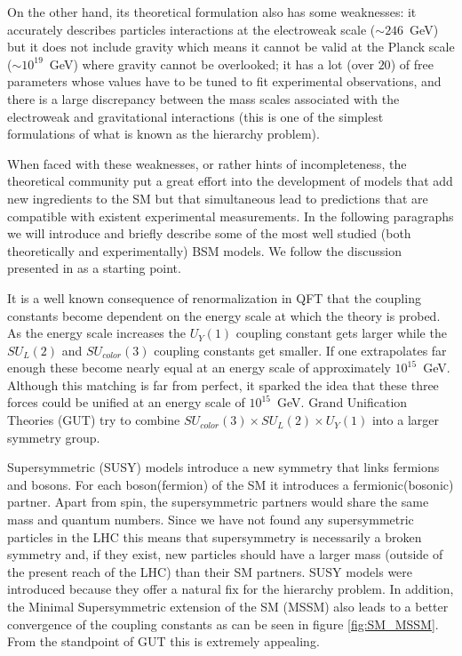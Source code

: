 On the other hand, its theoretical formulation also has some weaknesses: it accurately describes particles interactions at the electroweak scale ($\sim 246$~GeV) but it does not include gravity which means it cannot be valid at the Planck scale ($\sim 10^{19}$~GeV) where gravity cannot be overlooked; it has a lot (over $20$) of free parameters whose values have to be tuned to fit experimental observations, and there is a large discrepancy between the mass scales associated with the electroweak and gravitational interactions (this is one of the simplest formulations of what is known as the hierarchy problem).

When faced with these weaknesses, or rather hints of incompleteness, the theoretical community put a great effort into the development of models that add new ingredients to the SM but that simultaneous lead to predictions that are compatible with existent experimental measurements. In the following paragraphs we will introduce and briefly describe some of the most well studied (both theoretically and experimentally) BSM models. We follow the discussion presented in \cite{BSM_motivation} as a starting point.

It is a well known consequence of renormalization in QFT that the coupling constants become dependent on the energy scale at which the theory is probed. As the energy scale increases the $U_Y(1)$ coupling constant gets larger while the $SU_L(2)$ and $SU_{color}(3)$ coupling constants get smaller. If one extrapolates far enough these become nearly equal at an energy scale of approximately $10^{15}$~GeV. Although this matching is far from perfect, it sparked the idea that these three forces could be unified at an energy scale of $10^{15}$~GeV. Grand Unification Theories (GUT) try to combine $SU_{color}(3)\times SU_L(2)\times U_Y(1)$ into a larger symmetry group.

Supersymmetric (SUSY) models introduce a new symmetry that links fermions and bosons. For each boson(fermion) of the SM it introduces a fermionic(bosonic) partner. Apart from spin, the supersymmetric partners would share the same mass and quantum numbers. Since we have not found any supersymmetric particles in the LHC this means that supersymmetry is necessarily a broken symmetry and, if they exist, new particles should have a larger mass (outside of the present reach of the LHC) than their SM partners. SUSY models were introduced because they offer a natural fix for the hierarchy problem. In addition, the Minimal Supersymmetric extension of the SM (MSSM) also leads to a better convergence of the coupling constants as can be seen in figure \ref{fig:SM_MSSM}. From the standpoint of GUT this is extremely appealing.


